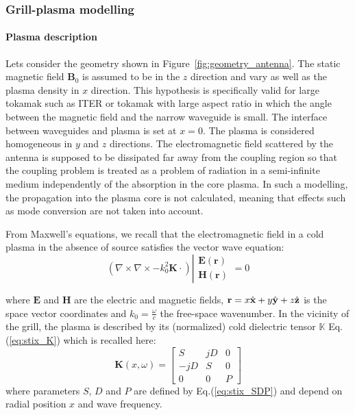 \subsubsection{Grill-plasma modelling}\label{sec:grill_modeling}

\paragraph{Plasma description}\label{sec:dielectric_tensor}

Lets consider the geometry shown in Figure~\ref{fig:geometry_antenna}. The static magnetic field $\mathbf{B}_{0}$ is assumed to be in the $z$ direction and vary as well as the plasma density in $x$ direction. This hypothesis is specifically valid for large tokamak such as ITER or tokamak with large aspect ratio in which the angle between the magnetic field and the narrow waveguide is small. The interface between waveguides and plasma is set at $x=0$. The plasma is considered homogeneous
in $y$ and $z$ directions. The electromagnetic field scattered by the antenna is supposed to be dissipated far away from the coupling region so that the coupling problem is treated as a problem of radiation in a semi-infinite medium independently of the absorption in the core plasma. In such a modelling, the propagation into the plasma core is not calculated, meaning that effects such as mode conversion are not taken into account. 

From Maxwell's equations, we recall that the electromagnetic field in a cold plasma in the absence of source satisfies the vector wave equation:
\begin{equation}
\left(\nabla\times\nabla\times-k_{0}^{2}\mathbf{K}\cdot\right)\left|\begin{array}{c}
\mathbf{E}(\mathbf{r})\\
\mathbf{H}(\mathbf{r})\end{array}\right.=0
\end{equation}

where $\mathbf{E}$ and $\mathbf{H}$ are the electric and magnetic fields, $\mathbf{r}=x\mbox{\ensuremath{\hat{\mathbf{x}}}}+y\hat{\mathbf{y}}+z\hat{\mathbf{z}}$ is the space vector coordinates and $k_{0}=\frac{\omega}{c}$ the free-space wavenumber. In the vicinity of the grill, the plasma is described by its (normalized) cold dielectric tensor $\mathbb{K}$ Eq.(\ref{eq:stix_K}) which is recalled here: 
\begin{equation}
	\mathbf{K}(x,\omega)=\left[\begin{array}{ccc}
	S & jD & 0\\
	-jD & S & 0\\
	0 & 0 & P\end{array}\right]
	\label{eq:dielectric_tensor}
\end{equation}
where parameters $S$, $D$ and $P$ are defined by Eq.(\ref{eq:stix_SDP}) and depend on radial position $x$ and wave frequency.

